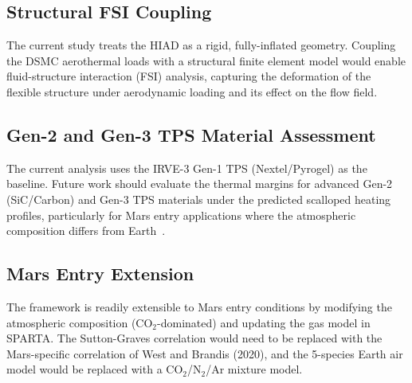 \subsection{Structural FSI Coupling}
The current study treats the HIAD as a rigid, fully-inflated geometry. Coupling the DSMC aerothermal loads with a structural finite element model would enable fluid-structure interaction (FSI) analysis, capturing the deformation of the flexible structure under aerodynamic loading and its effect on the flow field.

\subsection{Gen-2 and Gen-3 TPS Material Assessment}
The current analysis uses the IRVE-3 Gen-1 TPS (Nextel/Pyrogel) as the baseline. Future work should evaluate the thermal margins for advanced Gen-2 (SiC/Carbon) and Gen-3 TPS materials under the predicted scalloped heating profiles, particularly for Mars entry applications where the atmospheric composition differs from Earth~\cite{guidotti2023efesto2materials}.

\subsection{Mars Entry Extension}
The framework is readily extensible to Mars entry conditions by modifying the atmospheric composition (CO$_2$-dominated) and updating the gas model in SPARTA. The Sutton-Graves correlation would need to be replaced with the Mars-specific correlation of West and Brandis (2020), and the 5-species Earth air model would be replaced with a CO$_2$/N$_2$/Ar mixture model.

